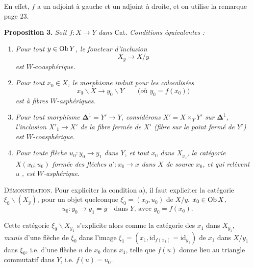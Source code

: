 En effet, $f$ a un adjoint à gauche et un adjoint à droite, et on utilise la remarque page 23.

\textbf{Proposition 3.} \textit{Soit $f : X \longrightarrow Y$ dans} \textup{Cat}. \textit{Conditions équivalentes :}


\begin{enumerate}
\item[\textit{a)}] \textit{Pour tout $y \in \operatorname{Ob} Y$, le foncteur d'inclusion}
\[
X_y \longrightarrow X/y \tag*{$(*)$}
\]
\textit{est $W$-}co\textit{asphérique.}
\item[\textit{b)}] \textit{Pour tout $x_0 \in X$, le morphisme induit pour les colocalisées}
\[
x_0\backslash X \longrightarrow y_0\backslash Y \qquad \textit{(où $y_0 = f(x_0)$)}
\]
\textit{est à fibres $W$-asphériques.}
\item[\textit{c)}] \textit{Pour tout morphisme $\mathbf{\Delta}^1 = Y' \longrightarrow Y$, considérons $X' = X \times_Y Y'$ sur $\mathbf{\Delta}^1$, l'inclusion $X'_1 \longrightarrow X'$ de la fibre fermée de $X'$ (fibre sur le point fermé de $Y'$) est $W$-coasphérique.}
\item[\textit{d)}] \textit{Pour toute flèche $u_0 : y_0 \longrightarrow y_1$ dans $Y$, et tout $x_0$ dans $X_{y_0}$, la catégorie $X(x_0;u_0)$ formée des flèches $u' : x_0 \longrightarrow x$ dans $X$ de source $x_0$, et qui relèvent $u$} \textit{, est $W$-asphérique.}
\end{enumerate}

\textsc{Démonstration.} Pour expliciter la condition a), il faut expliciter la catégorie $\xi_0\backslash(X_y)$, pour un objet quelconque $\xi_0 = (x_0, u_0)$ de $X/y$, $x_0 \in \operatorname{Ob} X$,
\[
u_0 : y_0 \longrightarrow y_1 = y \quad \text{dans $Y$, avec $y_0 = f(x_0)$.}
\]

Cette catégorie $\xi_0\backslash X_{y_1}$ s'explicite alors comme la catégorie des $x_1$ dans $X_{y_1}$, \textit{munis} d'une flèche de $\xi_0$ dans l'image $\xi_1 = (x_1, \mathrm{id}_{f(x_1)} = \mathrm{id}_{y_1})$ de $x_1$ dans $X/y_1$ dans $\xi_0$, i.e. d'une flèche $u$ de $x_0$ dans $x_1$, telle que $f(u)$ donne lieu au triangle commutatif dans $Y$, i.e. $f(u) = u_0$. %

\begin{center}
\end{center}

